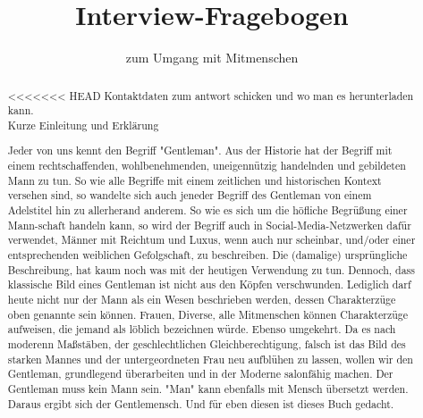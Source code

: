 \documentclass[a4paper,12pt]{scrartcl}
\begin{document}
\title{Interview-Fragebogen}
\author{zum Umgang mit Mitmenschen}
\date{}
\maketitle

\begin{abstract}
<<<<<<< HEAD
    {\color{red} Kontaktdaten zum antwort schicken und wo man es herunterladen kann.\\ Kurze Einleitung und Erklärung}


    Jeder von uns kennt den Begriff "Gentleman". Aus der Historie hat der Begriff mit einem rechtschaffenden, wohlbenehmenden, 
    uneigennützig handelnden und gebildeten Mann zu tun. So wie alle Begriffe mit einem zeitlichen und historischen Kontext
    versehen sind, so wandelte sich auch jeneder Begriff des Gentleman von einem Adelstitel hin zu allerherand anderem.
    So wie es sich um die höfliche Begrüßung einer Mann-schaft handeln kann, so wird der Begriff auch in Social-Media-Netzwerken
    dafür verwendet, Männer mit Reichtum und Luxus, wenn auch nur scheinbar, und/oder einer entsprechenden weiblichen Gefolgschaft,
    zu beschreiben. Die (damalige) ursprüngliche Beschreibung, hat kaum noch was mit der heutigen Verwendung zu tun.
    Dennoch, dass klassische Bild eines Gentleman ist nicht aus den Köpfen verschwunden. Lediglich darf heute nicht nur der
    Mann als ein Wesen beschrieben werden, dessen Charakterzüge oben genannte sein können. Frauen, Diverse, alle Mitmenschen
    können Charakterzüge aufweisen, die jemand als löblich bezeichnen würde. Ebenso umgekehrt.
    Da es nach moderenn Maßstäben, der geschlechtlichen Gleichberechtigung, falsch ist das Bild des starken Mannes und der 
    untergeordneten Frau neu aufblühen zu lassen, wollen wir den Gentleman, grundlegend überarbeiten 
    und in der Moderne salonfähig machen. Der Gentleman muss kein Mann sein. "Man" kann ebenfalls mit Mensch übersetzt werden.
    Daraus ergibt sich der Gentlemensch. Und für eben diesen ist dieses Buch gedacht.
    \\ 
    \\ 
    

\end{abstract}
\end{document}
